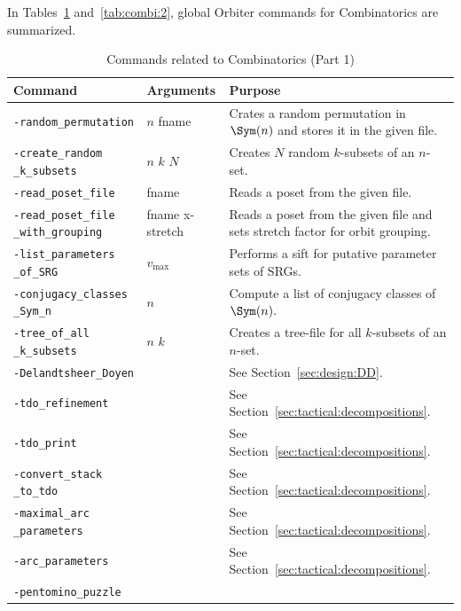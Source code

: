 In Tables~\ref{tab:combi} and~\ref{tab:combi:2},  
global Orbiter commands for Combinatorics are summarized.
\begin{table}
	\begin{center}
	\begin{tabular}{|p{4cm}|p{3cm}|p{7cm}|}
		\hline
		Command & Arguments & Purpose \\
		\hline
		\hline
		\verb'-random_permutation' &  $n$ fname & Crates a random permutation in $\Sym(n)$ and stores it in the given file.\\
		\hline
		\verb'-create_random' \verb'_k_subsets' & $n$ $k$ $N$  & Creates $N$ random $k$-subsets of an $n$-set. \\
		\hline
		\verb'-read_poset_file' & fname  & Reads a poset from the given file. \\
		\hline
		\verb'-read_poset_file' \verb'_with_grouping' & fname x-stretch  & Reads a poset from the given file and sets stretch factor for orbit grouping. \\
		\hline
		\verb'-list_parameters' \verb'_of_SRG' &  $v_{\max}$ & Performs a sift for putative parameter sets of SRGs. \\
		\hline
		\verb'-conjugacy_classes' \verb'_Sym_n' & $n$  & Compute a list of conjugacy classes of $\Sym(n).$ \\
		\hline
		\verb'-tree_of_all' \verb'_k_subsets' & $n$ $k$  & Creates a tree-file for all $k$-subsets of an $n$-set. \\
		\hline
		\verb'-Delandtsheer_Doyen' &   & See Section~\ref{sec:design:DD}. \\
		\hline
		\verb'-tdo_refinement' &   & See Section~\ref{sec:tactical:decompositions}. \\
		\hline
		\verb'-tdo_print' &   & See Section~\ref{sec:tactical:decompositions}. \\
		\hline
		\verb'-convert_stack' \verb'_to_tdo' &   & See Section~\ref{sec:tactical:decompositions}. \\
		\hline
		\verb'-maximal_arc' \verb'_parameters' &   & See Section~\ref{sec:tactical:decompositions}. \\
		\hline
		\verb'-arc_parameters' &   & See Section~\ref{sec:tactical:decompositions}. \\
		\hline
		\verb'-pentomino_puzzle' &   &  \\
		\hline
		\end{tabular}
	\end{center}
	\caption{\label{tab:combi}Commands related to Combinatorics (Part 1)}
	\end{table}

